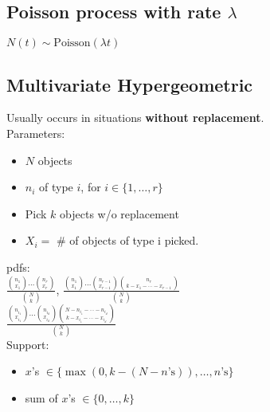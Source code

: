 \subsection*{Poisson process with rate \(\lambda\)}
\(N(t) \sim \text{Poisson}(\lambda t)\)

\subsection*{Multivariate Hypergeometric}
Usually occurs in situations \textbf{without replacement}.\\
Parameters:
\begin{itemize}
  \item \(N\) objects
  \item \(n_i\) of type \(i\), for \(i \in \{1, \dotsc, r\}\)
  \item Pick \(k\) objects w/o replacement
  \item \(X_i =\) \# of objects of type i picked.
\end{itemize}
pdfs:\\
\(\frac{\binom{n_1}{x_1} \dots \binom{n_r}{x_r}}{\binom{N}{k}}\),
\(\frac{\binom{n_1}{x_1} \dots \binom{n_{r-1}}{x_{r-1}}
  \binom{n_r}{k-x_1- \dotsb - x_{r-1}}}
  {\binom{N}{k}}\)\\
\(\frac{\binom{n_{i_1}}{x_{i_1}} \dots \binom{n_{i_d}}{x_{i_d}}
  \binom{N-n_{i_1}- \dotsb -n_{i_d}}{k-x_{i_1}- \dotsb -x_{i_d}}}
  {\binom{N}{k}}\)\\
Support:
\begin{itemize}
  \item \(x\)'s \(\in \{\max(0, k-(N-n\text{'s})), \dotsc, n\text{'s}\}\)
  \item sum of \(x\)'s \(\in \{0, \dotsc, k\}\)
\end{itemize}

